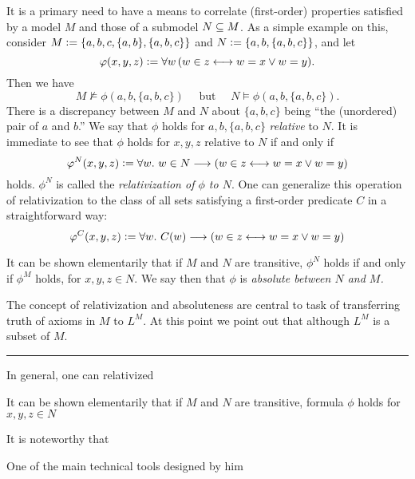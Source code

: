 It is a primary need to have a means to correlate  (first-order)
properties satisfied by a model $M$ and those of a 
submodel $N\subseteq M$. As a simple example on this, consider 
$M\mathrel{\mathop:}= \{a,b,c, \{a,b\},\{a,b,c\}\}$ and
$N\mathrel{\mathop:}=\{a,b,\{a,b,c\}\}$, and let 
\[
\varphi(x,y,z)\mathrel{\mathop:}= \forall w \,( w\in z \longleftrightarrow w=x \vee w=y).
\]
Then we have
\[
M\not\models \phi(a,b,\{a,b,c\}) \quad\text{ but }\quad N\models \phi(a,b,\{a,b,c\}).
\]
There is a discrepancy between  $M$ and $N$ about $\{a,b,c\}$ being ``the
(unordered) pair of $a$ and $b$.'' We say that $\phi$ holds for
$a,b,\{a,b,c\}$ \emph{relative} to $N$. It is immediate to see that
$\phi$ holds  for $x,y,z$ relative to $N$ if and only if
\[
\varphi^N(x,y,z)\mathrel{\mathop:}= \forall w.\ w\in N\longrightarrow ( w\in z \longleftrightarrow w=x \vee w=y)
\] 
holds. $\phi^N$ is called the \emph{relativization of $\phi$ to
  $N$}. One can generalize this operation of relativization to the
class of all sets satisfying a first-order predicate $C$ in a
straightforward way:
\[
\varphi^C(x,y,z)\mathrel{\mathop:}= \forall w.\ C(w)\longrightarrow ( w\in z \longleftrightarrow w=x \vee w=y)
\] 

It can be shown elementarily that if $M$ and $N$ are transitive,
$\phi^N$ holds if and only if $\phi^M$ holds,  for $x,y,z\in N$. We
say then that $\phi$ is \emph{absolute between $N$ and $M$.}

The concept of relativization and absoluteness are central to task of
transferring truth of axioms in $M$ to  $L^M$. At this point we 
point out that although $L^M$ is a subset of $M$. 
\bigskip

\hrule
\bigskip

In general, one can relativized

It can be shown elementarily that if $M$ and $N$ are transitive,
formula $\phi$ holds for $x,y,z\in N$ 

It is noteworthy that 



 One of the main
technical tools designed by him 


